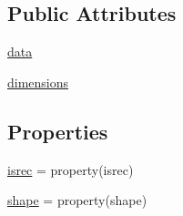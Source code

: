 \subsection*{Public Attributes}
\begin{DoxyCompactItemize}
\item 
\hyperlink{classscipy_1_1io_1_1netcdf_1_1netcdf__variable_af2732419bf02d00fc56de0296af8100e}{data}
\item 
\hyperlink{classscipy_1_1io_1_1netcdf_1_1netcdf__variable_a98ecf2e25172a515f13f3e8cdb9d1f55}{dimensions}
\end{DoxyCompactItemize}
\subsection*{Properties}
\begin{DoxyCompactItemize}
\item 
\hyperlink{classscipy_1_1io_1_1netcdf_1_1netcdf__variable_aeff5d12ab64549605fbd15bd22489e2d}{isrec} = property(isrec)
\item 
\hyperlink{classscipy_1_1io_1_1netcdf_1_1netcdf__variable_ada88b70101cf92620e9653eea8b0fa34}{shape} = property(shape)
\end{DoxyCompactItemize}



